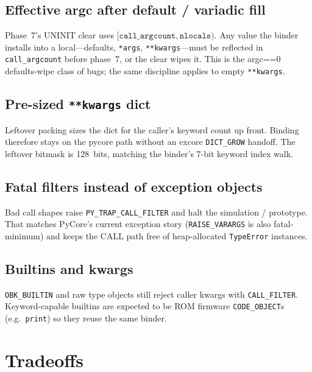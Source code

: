 \documentclass[11pt,a4paper]{article}
\begin{document}
\subsection{Effective argc after default / variadic fill}
Phase~7's UNINIT clear uses $[\texttt{call\_argcount}, \texttt{nlocals})$.
Any value the binder installs into a local---defaults, \texttt{*args},
\texttt{**kwargs}---must be reflected in \texttt{call\_argcount} before phase~7,
or the clear wipes it.
This is the argc==0 defaults-wipe class of bugs; the same discipline applies to
empty \texttt{**kwargs}.

\subsection{Pre-sized \texttt{**kwargs} dict}
Leftover packing sizes the dict for the caller's keyword count up front.
Binding therefore stays on the pycore path without an excore
\texttt{DICT\_GROW} handoff.
The leftover bitmask is 128~bits, matching the binder's 7-bit keyword index
walk.

\subsection{Fatal filters instead of exception objects}
Bad call shapes raise \texttt{PY\_TRAP\_CALL\_FILTER} and halt the simulation /
prototype.
That matches PyCore's current exception story (\texttt{RAISE\_VARARGS} is also
fatal-minimum) and keeps the CALL path free of heap-allocated
\texttt{TypeError} instances.

\subsection{Builtins and kwargs}
\texttt{OBK\_BUILTIN} and raw type objects still reject caller kwargs with
\texttt{CALL\_FILTER}.
Keyword-capable builtins are expected to be ROM firmware \texttt{CODE\_OBJECT}s
(e.g.\ \texttt{print}) so they reuse the same binder.

\section{Tradeoffs}
\end{document}

